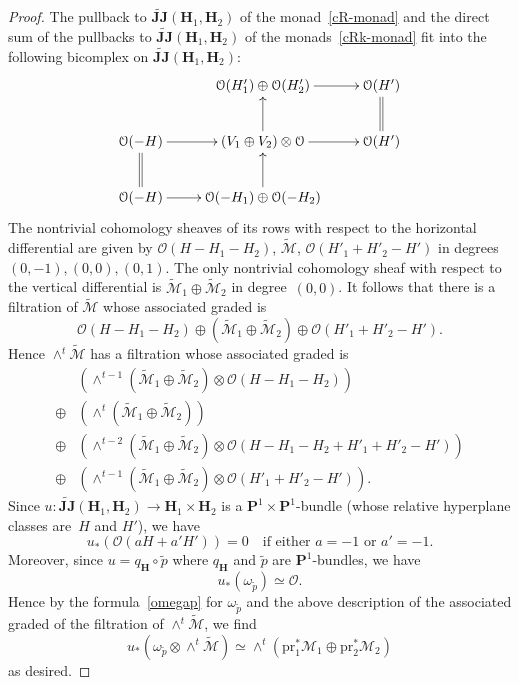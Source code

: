 \documentclass[11pt, reqno]{amsart}
\numberwithin{equation}{section}
\theoremstyle{plain}
\theoremstyle{definition}
\newcommand{\wtilde}{\widetilde}
\newcommand{\tJJ}{{\widetilde{\bJ\bJ}}}
\newcommand{\tp}{{\tilde{p}}}
\newcommand{\tM}{{\wtilde{\cM}}}
\newcommand{\omegatp}{\omega_{\tp}}
\newcommand{\pr}{\mathrm{pr}}
\newcommand{\cO}{\mathcal{O}}
\newcommand{\cM}{\mathcal{M}}
\newcommand{\bH}{\mathbf{H}}
\newcommand{\bJ}{\mathbf{J}}
\newcommand{\bP}{\mathbf{P}}
\begin{document}
\begin{proof}
The pullback to $\tJJ(\bH_1, \bH_2)$ of the monad~\eqref{cR-monad} and 
the direct sum of the pullbacks to $\tJJ(\bH_1, \bH_2)$ 
of the monads~\eqref{cRk-monad} fit 
into the following bicomplex on $\tJJ(\bH_1, \bH_2)$: 
\begin{equation*}
\xymatrix{
& \cO(H'_1) \oplus \cO(H'_2) \ar[r] &
\cO(H')
\\
\cO(-H) \ar[r] &
(V_1 \oplus V_2) \otimes \cO \ar[r] \ar[u] &
\cO(H') \ar@{=}[u] 
\\
\cO(-H) \ar[r] \ar@{=}[u] &
\cO(-H_1) \oplus \cO(-H_2) \ar[u] 
}
\end{equation*}
The nontrivial cohomology sheaves of its rows with respect to the horizontal differential 
are given by \mbox{$\cO(H-H_1-H_2)$}, $\tM$, $\cO(H'_1+H'_2-H')$ in degrees $(0,-1), (0,0), (0,1)$. 
The only nontrivial cohomology sheaf with respect to the vertical differential 
is $\tM_1 \oplus \tM_2$ in degree~$(0,0)$. 
It follows that there is a filtration of $\tM$ whose associated graded is 
\begin{equation*}
\cO(H-H_1-H_2) \oplus (\tM_1 \oplus \tM_2) \oplus \cO(H'_1+H'_2-H'). 
\end{equation*}
Hence $\wedge^t \tM$ has a filtration whose associated graded is 
\begin{align*}
& \left( \wedge^{t-1}(\tM_1 \oplus \tM_2) \otimes \cO(H-H_1-H_2) \right) \\  
\oplus & \left( \wedge^t(\tM_1 \oplus \tM_2)  \right) \\ 
\oplus & \left( \wedge^{t-2}(\tM_1 \oplus \tM_2) \otimes \cO(H-H_1-H_2+H'_1+H'_2-H') \right) \\ 
\oplus & \left( \wedge^{t-1}(\tM_1 \oplus \tM_2) \otimes \cO(H'_1+H'_2-H') \right). 
\end{align*} 
Since $u \colon \tJJ(\bH_1, \bH_2) \to \bH_1 \times \bH_2$ is a $\bP^1 \times \bP^1$-bundle 
(whose relative hyperplane classes are~$H$ and $H'$), we have
\begin{equation*}
u_*(\cO(aH + a'H')) = 0 \quad \text{if either $a = -1$ or $a' = -1$.} 
\end{equation*}
Moreover, since $u = q_{\bH} \circ \tp$ where $q_{\bH}$ and $\tp$ are 
$\bP^1$-bundles, we have 
\begin{equation*}
u_*(\omegatp)  \simeq \cO. 
\end{equation*}
Hence by the formula~\eqref{omegap} for $\omegatp$ and the above description of the 
associated graded of the filtration of $\wedge^t \tM$, we find 
\begin{equation*}
u_*(\omegatp \otimes \wedge^t \tM) \simeq \wedge^t(\pr_1^*\cM_1 \oplus \pr_2^*\cM_2)  
\end{equation*}
as desired. 
\end{proof} 
\end{document}
